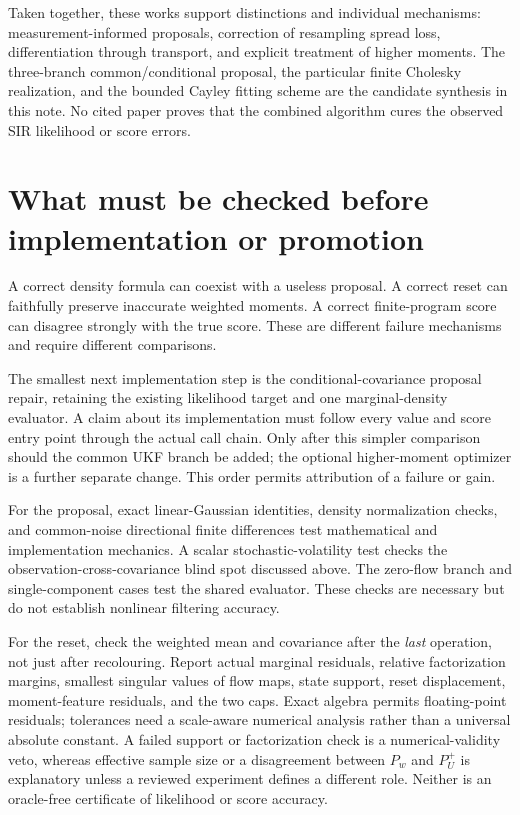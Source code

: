 \documentclass[11pt,a4paper]{article}
\begin{document}
Taken together, these works support distinctions and individual mechanisms:
measurement-informed proposals, correction of resampling spread loss,
differentiation through transport, and explicit treatment of higher moments.
The three-branch common/conditional proposal, the particular finite
Cholesky realization, and the bounded Cayley fitting scheme are the
candidate synthesis in this note. No cited paper proves that the combined
algorithm cures the observed SIR likelihood or score errors.

\section{What must be checked before implementation or promotion}

A correct density formula can coexist with a useless proposal. A correct
reset can faithfully preserve inaccurate weighted moments. A correct
finite-program score can disagree strongly with the true score. These
are different failure mechanisms and require different comparisons.

The smallest next implementation step is the conditional-covariance
proposal repair, retaining the existing likelihood target and one
marginal-density evaluator. A claim about its implementation must follow
every value and score entry point through the actual call chain.
Only after this simpler comparison should the common UKF branch be added;
the optional higher-moment optimizer is a further separate change.
This order permits attribution of a failure or gain.

For the proposal, exact linear-Gaussian identities, density normalization
checks, and common-noise directional finite differences test mathematical
and implementation mechanics. A scalar stochastic-volatility test checks
the observation-cross-covariance blind spot discussed above. The zero-flow
branch and single-component cases test the shared evaluator. These checks
are necessary but do not establish nonlinear filtering accuracy.

For the reset, check the weighted mean and covariance after the \emph{last}
operation, not just after recolouring. Report actual marginal residuals,
relative factorization margins, smallest singular values of flow maps,
state support, reset displacement, moment-feature residuals, and the two
caps. Exact algebra permits floating-point residuals; tolerances need a
scale-aware numerical analysis rather than a universal absolute constant.
A failed support or factorization check is a numerical-validity veto,
whereas effective sample size or a disagreement between \(P_w\) and
\(P_U^+\) is explanatory unless a reviewed experiment defines a different
role. Neither is an oracle-free certificate of likelihood or score accuracy.
\end{document}
